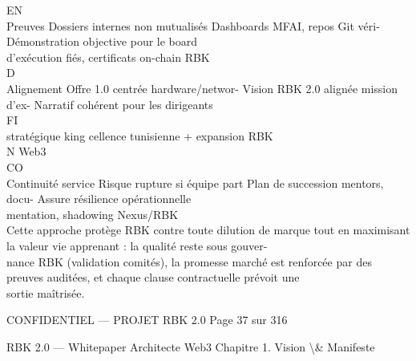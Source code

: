 EN\\
Preuves              Dossiers internes non mutualisés    Dashboards MFAI, repos Git véri- Démonstration objective pour le board\\
d’exécution                                              fiés, certificats on-chain       RBK\\
\vspace{0.5em}
\vspace{0.5em}
\vspace{0.5em}
\vspace{0.5em}
D\\
Alignement           Offre 1.0 centrée hardware/networ- Vision RBK 2.0 alignée mission d’ex- Narratif cohérent pour les dirigeants\\
\vspace{0.5em}
\vspace{0.5em}
\vspace{0.5em}
\vspace{0.5em}
FI\\
stratégique          king                               cellence tunisienne + expansion RBK\\
\vspace{0.5em}
N         Web3\\
CO\\
Continuité service   Risque rupture si équipe part       Plan de succession mentors, docu- Assure résilience opérationnelle\\
mentation, shadowing Nexus/RBK\\
\vspace{0.5em}
\vspace{0.5em}
Cette approche protège RBK contre toute dilution de marque tout en maximisant la valeur vie apprenant : la qualité reste sous gouver-\\
nance RBK (validation comités), la promesse marché est renforcée par des preuves auditées, et chaque clause contractuelle prévoit une\\
sortie maîtrisée.\\
\vspace{0.5em}
\vspace{0.5em}
\vspace{0.5em}
\vspace{0.5em}
\begin{confidential}CONFIDENTIEL — PROJET RBK 2.0                               Page 37 sur 316\end{confidential}
RBK 2.0 — Whitepaper Architecte Web3                                                                        Chapitre 1. Vision \textbackslash{}& Manifeste\\
